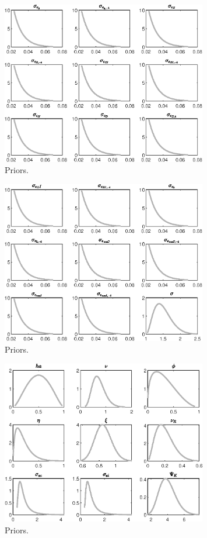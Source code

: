  
\begin{figure}[H]
\centering
\includegraphics[width=0.80\textwidth]{BRS_sectoral/graphs/BRS_sectoral_Priors1}
\caption{Priors.}\label{Fig:Priors:1}
\end{figure}
\begin{figure}[H]
\centering
\includegraphics[width=0.80\textwidth]{BRS_sectoral/graphs/BRS_sectoral_Priors2}
\caption{Priors.}\label{Fig:Priors:2}
\end{figure}
\begin{figure}[H]
\centering
\includegraphics[width=0.80\textwidth]{BRS_sectoral/graphs/BRS_sectoral_Priors3}
\caption{Priors.}\label{Fig:Priors:3}
\end{figure}
